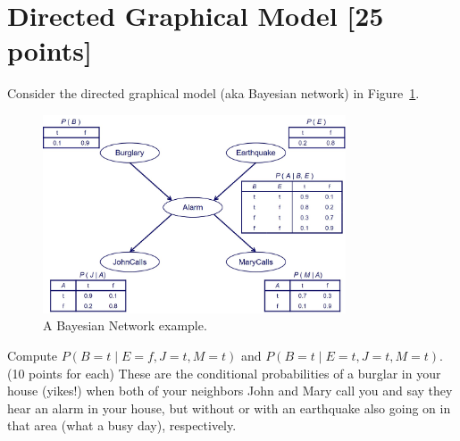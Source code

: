 \documentclass[a4paper]{article}
\theoremstyle{definition}
\begin{document}
\section{Directed Graphical Model [25 points]}
Consider the directed graphical model (aka Bayesian network) in Figure~\ref{fig:bn}.
\begin{figure}[H]
    \centering
    \includegraphics[width=0.8\textwidth]{BN.jpeg}
    \caption{A Bayesian Network example.}
    \label{fig:bn}
\end{figure}
Compute $P(B=t \mid E=f,J=t,M=t)$ and $P(B=t \mid E=t,J=t,M=t)$. (10 points for each) These are the conditional probabilities of a burglar in your house (yikes!) when both of your neighbors John and Mary call you and say they hear an alarm in your house, but without or with an earthquake also going on in that area (what a busy day), respectively.
\end{document}
